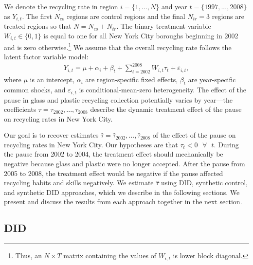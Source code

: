 \documentclass[12pt]{article}
\begin{document}
We denote the recycling rate in region \(i = \lbrace 1,...,N \rbrace\) and year \(t = \lbrace 1997,...,2008 \rbrace\) as \(Y_{i,t}\).  The first \(N_{co}\) regions are control regions and the final \(N_{tr} = 3\) regions are treated regions so that \(N=N_{co}+N_{tr}\).  The binary treatment variable \(W_{i,t} \in \lbrace 0,1 \rbrace\) is equal to one for all New York City boroughs beginning in 2002 and is zero otherwise.\footnote{Thus, an \(N \times T\) matrix containing the values of \(W_{i,t}\) is lower block diagonal.}  We assume that the overall recycling rate follows the latent factor variable model:
\begin{align} \label{eq:factormodel}
    Y_{i,t} = \mu + \alpha_i + \beta_t + \sum_{t=2002}^{2008} W_{i,t} \tau_t + \varepsilon_{i,t},
\end{align}
where \(\mu\) is an intercept, \(\alpha_i\) are region-specific fixed effects, \(\beta_t\) are year-specific common shocks, and \(\varepsilon_{i,t}\) is conditional-mean-zero heterogeneity.  The effect of the pause in glass and plastic recycling collection potentially varies by year---the coefficients \(\tau = \tau_{2002},...,\tau_{2008}\) describe the dynamic treatment effect of the pause on recycling rates in New York City.  

Our goal is to recover estimates \(\hat{\tau} = \hat{\tau}_{2002},...,\hat{\tau}_{2008}\) of the effect of the pause on recycling rates in New York City.  Our hypotheses are that \(\tau_t < 0 \text{ } \forall \text{ } t\).  During the pause from 2002 to 2004, the treatment effect should mechanically be negative because glass and plastic were no longer accepted.  After the pause from 2005 to 2008, the treatment effect would be negative if the pause affected recycling habits and skills negatively.  We estimate \(\hat{\tau}\) using DID, synthetic control, and synthetic DID approaches, which we describe in the following sections.  We present and discuss the results from each approach together in the next section.

\subsection{DID}
\end{document}
